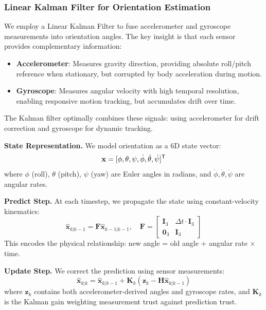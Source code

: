 \subsubsection{Linear Kalman Filter for Orientation Estimation}

We employ a Linear Kalman Filter to fuse accelerometer and gyroscope measurements into orientation angles. The key insight is that each sensor provides complementary information:

\begin{itemize}
    \item \textbf{Accelerometer}: Measures gravity direction, providing absolute roll/pitch reference when stationary, but corrupted by body acceleration during motion.
    \item \textbf{Gyroscope}: Measures angular velocity with high temporal resolution, enabling responsive motion tracking, but accumulates drift over time.
\end{itemize}

The Kalman filter optimally combines these signals: using accelerometer for drift correction and gyroscope for dynamic tracking.

\textbf{State Representation.} We model orientation as a 6D state vector:
\begin{equation}
\mathbf{x} = [\phi, \theta, \psi, \dot{\phi}, \dot{\theta}, \dot{\psi}]^{\mathsf{T}}
\end{equation}
where $\phi$ (roll), $\theta$ (pitch), $\psi$ (yaw) are Euler angles in radians, and $\dot{\phi}, \dot{\theta}, \dot{\psi}$ are angular rates.

\textbf{Predict Step.} At each timestep, we propagate the state using constant-velocity kinematics:
\begin{equation}
\hat{\mathbf{x}}_{k|k-1} = \mathbf{F} \hat{\mathbf{x}}_{k-1|k-1}, \quad \mathbf{F} = \begin{bmatrix} \mathbf{I}_3 & \Delta t \cdot \mathbf{I}_3 \\ \mathbf{0}_3 & \mathbf{I}_3 \end{bmatrix}
\end{equation}
This encodes the physical relationship: new angle = old angle + angular rate $\times$ time.

\textbf{Update Step.} We correct the prediction using sensor measurements:
\begin{equation}
\hat{\mathbf{x}}_{k|k} = \hat{\mathbf{x}}_{k|k-1} + \mathbf{K}_k (\mathbf{z}_k - \mathbf{H}\hat{\mathbf{x}}_{k|k-1})
\end{equation}
where $\mathbf{z}_k$ contains both accelerometer-derived angles and gyroscope rates, and $\mathbf{K}_k$ is the Kalman gain weighting measurement trust against prediction trust.

